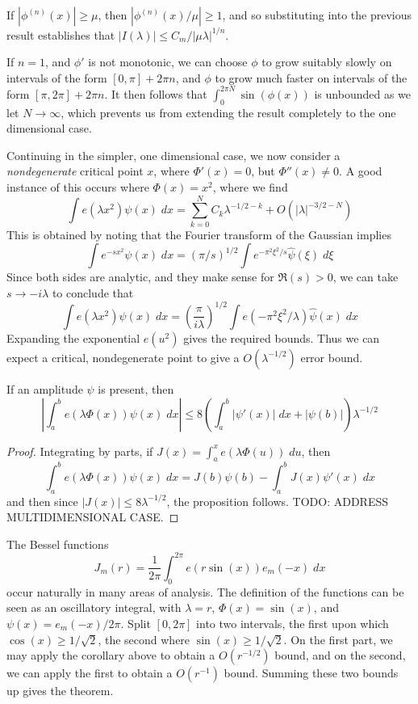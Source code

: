 \begin{remark}
	If $|\phi^{(n)}(x)| \geq \mu$, then $|\phi^{(n)}(x)/\mu| \geq 1$, and so substituting into the previous result establishes that $|I(\lambda)| \leq C_m / |\mu \lambda|^{1/n}$.
\end{remark}

\begin{remark}
	If $n = 1$, and $\phi'$ is not monotonic, we can choose $\phi$ to grow suitably slowly on intervals of the form $[0,\pi] + 2 \pi n$, and $\phi$ to grow much faster on intervals of the form $[\pi, 2\pi] + 2 \pi n$. It then follows that $\int_0^{2 \pi N} \sin(\phi(x))$ is unbounded as we let $N \to \infty$, which prevents us from extending the result completely to the one dimensional case.
\end{remark}

Continuing in the simpler, one dimensional case, we now consider a {\it nondegenerate} critical point $x$, where $\Phi'(x) = 0$, but $\Phi''(x) \neq 0$. A good instance of this occurs where $\Phi(x) = x^2$, where we find
%
\[ \int e(\lambda x^2) \psi(x)\; dx = \sum_{k = 0}^N C_k \lambda^{-1/2-k} + O(|\lambda|^{-3/2-N}) \]
%
This is obtained by noting that the Fourier transform of the Gaussian implies
%
\[ \int e^{- sx^2} \psi(x)\; dx = (\pi/s)^{1/2} \int e^{- \pi^2 \xi^2/ s} \widehat{\psi}(\xi)\; d\xi \]
%
Since both sides are analytic, and they make sense for $\Re(s) > 0$, we can take $s \to -i\lambda$ to conclude that
%
\[ \int e(\lambda x^2) \psi(x)\; dx = \left( \frac{\pi}{i \lambda} \right)^{1/2} \int e(-\pi^2 \xi^2/\lambda) \widehat{\psi}(x)\; dx \]
%
Expanding the exponential $e(u^2)$ gives the required bounds. Thus we can expect a critical, nondegenerate point to give a $O(\lambda^{-1/2})$ error bound.

\begin{corollary}
	If an amplitude $\psi$ is present, then
	\[ \left| \int_a^b e(\lambda \Phi(x)) \psi(x)\; dx \right| \leq 8 \left( \int_a^b |\psi'(x)|\; dx + |\psi(b)| \right) \lambda^{-1/2} \]
\end{corollary}
\begin{proof}
	Integrating by parts, if $J(x) = \int_a^x e(\lambda \Phi(u))\; du$, then
	\[ \int_a^b e(\lambda \Phi(x)) \psi(x)\; dx = J(b)\psi(b) - \int_a^b J(x) \psi'(x)\; dx \]
	and then since $|J(x)| \leq 8\lambda^{-1/2}$, the proposition follows. TODO: ADDRESS MULTIDIMENSIONAL CASE.
\end{proof}

\begin{example}
	The Bessel functions
	\[ J_m(r) = \frac{1}{2\pi} \int_0^{2\pi} e(r \sin(x)) e_m(-x)\; dx \]
	occur naturally in many areas of analysis. The definition of the functions can be seen as an oscillatory integral, with $\lambda = r$, $\Phi(x) = \sin(x)$, and $\psi(x) = e_m(-x)/2\pi$. Split $[0,2\pi]$ into two intervals, the first upon which $\cos(x) \geq 1/\sqrt{2}$, the second where $\sin(x) \geq 1/\sqrt{2}$. On the first part, we may apply the corollary above to obtain a $O(r^{-1/2})$ bound, and on the second, we can apply the first to obtain a $O(r^{-1})$ bound. Summing these two bounds up gives the theorem.
\end{example}

